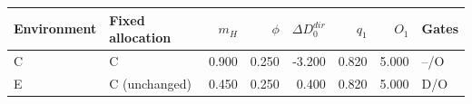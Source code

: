 \begin{tabular}{llrrrrrl}
\toprule
Environment & Fixed allocation & $m_H$ & $\phi$ & $\Delta D_0^{dir}$ & $q_1$ & $O_1$ & Gates \\
\midrule
C & C & 0.900 & 0.250 & -3.200 & 0.820 & 5.000 & --/O \\
E & C (unchanged) & 0.450 & 0.250 & 0.400 & 0.820 & 5.000 & D/O \\
\bottomrule
\end{tabular}
